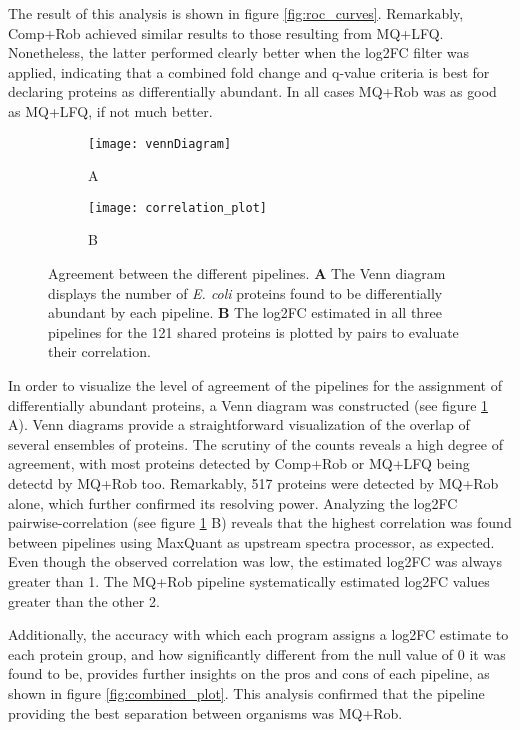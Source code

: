 The result of this analysis is shown in figure \ref{fig:roc_curves}. Remarkably, Comp+Rob achieved similar results to those resulting from MQ+LFQ. Nonetheless, the latter performed clearly better when the \ac{log2FC} filter was applied, indicating that a combined fold change and q-value criteria is best for declaring proteins as differentially abundant. In all cases MQ+Rob was as good as MQ+LFQ, if not much better.


\begin{figure}[H]
\centering
\begin{subfigure}{.40\textwidth}
\caption*{A}
\texttt{[image: vennDiagram]}
\end{subfigure}
\begin{subfigure}{.52\textwidth}
\caption*{B}
\texttt{[image: correlation\_plot]}
\end{subfigure}
\caption[Pipeline agreement plots]{Agreement between the different pipelines. \textbf{A} The Venn diagram displays the number of \textit{E. coli} proteins found to be differentially abundant by each pipeline. \textbf{B} The log2FC estimated in all three pipelines for the 121 shared proteins is plotted by pairs to evaluate their correlation.}
\label{fig:venn_cor}
\end{figure}


In order to visualize the level of agreement of the pipelines for the assignment of differentially abundant proteins, a Venn diagram was constructed (see figure \ref{fig:venn_cor} A). Venn diagrams provide a straightforward visualization of the overlap of several ensembles of proteins. The scrutiny of the counts reveals a high degree of agreement, with most proteins detected by Comp+Rob or MQ+LFQ being detectd by MQ+Rob too. Remarkably, 517 proteins were detected by MQ+Rob alone, which further confirmed its resolving power. Analyzing the log2FC pairwise-correlation (see figure \ref{fig:venn_cor} B) reveals that the highest correlation was found between pipelines using MaxQuant as upstream spectra processor, as expected. Even though the observed correlation was low, the estimated log2FC was always greater than 1. The MQ+Rob pipeline systematically estimated \ac{log2FC} values greater than the other 2.


Additionally, the accuracy with which each program assigns a \ac{log2FC} estimate to each protein group, and how significantly different from the null value of 0 it was found to be, provides further insights on the pros and cons of each pipeline, as shown in figure \ref{fig:combined_plot}. This analysis confirmed that the pipeline providing the best separation between organisms was MQ+Rob.




